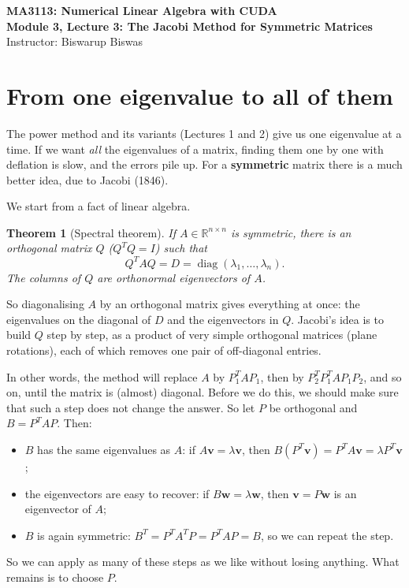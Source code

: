 \documentclass[11pt,a4paper]{article}
\newtheorem{theorem}{Theorem}
\theoremstyle{definition}
\theoremstyle{remark}
\newcommand{\R}{\mathbb{R}}
\begin{document}
\begin{center}
    {\LARGE \bfseries \color{primary} MA3113: Numerical Linear Algebra with CUDA} \\[0.5em]
    {\large \bfseries Module 3, Lecture 3: The Jacobi Method for Symmetric Matrices} \\[0.5em]
    {\small Instructor: Biswarup Biswas}
\end{center}

\vspace{1em}

\section{From one eigenvalue to all of them}
The power method and its variants (Lectures 1 and 2) give us one eigenvalue at a time. If we want
\emph{all} the eigenvalues of a matrix, finding them one by one with deflation is slow, and the errors pile up.
For a \textbf{symmetric} matrix there is a much better idea, due to Jacobi (1846).

We start from a fact of linear algebra.

\begin{theorem}[Spectral theorem]
If $A\in\R^{n\times n}$ is symmetric, there is an orthogonal matrix $Q$ ($Q^TQ=I$) such that
\[
Q^TAQ=D=\operatorname{diag}(\lambda_1,\dots,\lambda_n).
\]
The columns of $Q$ are orthonormal eigenvectors of $A$.
\end{theorem}

So diagonalising $A$ by an orthogonal matrix gives everything at once: the eigenvalues on the diagonal
of $D$ and the eigenvectors in $Q$. Jacobi's idea is to build $Q$ step by step, as a product of very simple
orthogonal matrices (plane rotations), each of which removes one pair of off-diagonal entries.

In other words, the method will replace $A$ by $P_1^TAP_1$, then by $P_2^TP_1^TAP_1P_2$, and so on, until the matrix
is (almost) diagonal. Before we do this, we should make sure that such a step does not change the answer.
So let $P$ be orthogonal and $B=P^TAP$. Then:
\begin{itemize}[nosep]
\item $B$ has the same eigenvalues as $A$: if $A\bm v=\lambda\bm v$, then $B(P^T\bm v)=P^TA\bm v=\lambda P^T\bm v$;
\item the eigenvectors are easy to recover: if $B\bm w=\lambda\bm w$, then $\bm v=P\bm w$ is an eigenvector of $A$;
\item $B$ is again symmetric: $B^T=P^TA^TP=P^TAP=B$, so we can repeat the step.
\end{itemize}
So we can apply as many of these steps as we like without losing anything. What remains is to choose $P$.
\end{document}
